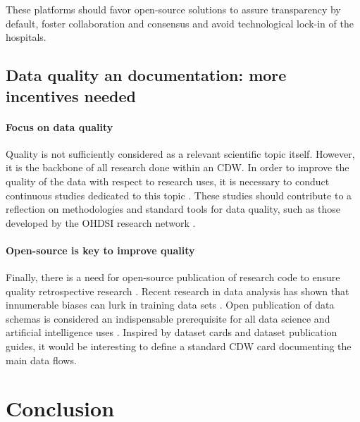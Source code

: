 \documentclass[french,12pt,twoside,a4paper]{book}
\begin{document}
These platforms should favor open-source solutions to assure transparency by
default, foster collaboration and consensus and avoid technological lock-in of
the hospitals.

\subsection{Data quality an documentation: more incentives needed}%
\label{subsec:cdw:recommendations:quality}%

\paragraph{Focus on data quality} Quality is not sufficiently considered as a relevant scientific topic itself.
However, it is the backbone of all research done within an CDW. In order to
improve the quality of the data with respect to research uses, it is necessary
to conduct continuous studies dedicated to this topic
\citep{zhang_best_2022,kohane_what_2021,shang_conceptual_2018,looten_what_2019}.
These studies should contribute to a reflection on methodologies and standard
tools for data quality, such as those developed by the OHDSI research network
\citep{schuemie_book_2021}.

\paragraph{Open-source is key to improve quality} Finally, there is a need for
open-source publication of research code to ensure quality retrospective
research \citep{shang_conceptual_2018,seastedt_global_2022}. Recent research in
data analysis has shown that innumerable biases can lurk in training data sets
\citep{gebru_datasheets_2021,mehrabi_survey_2021}. Open publication of data
schemas is considered an indispensable prerequisite for all data science and
artificial intelligence uses \citep{gebru_datasheets_2021}. Inspired by dataset
cards \citep{gebru_datasheets_2021} and dataset publication guides, it would be
interesting to define a standard CDW card documenting the main data flows.

\section{Conclusion}\label{sec:cdw:conclusion}
\end{document}
